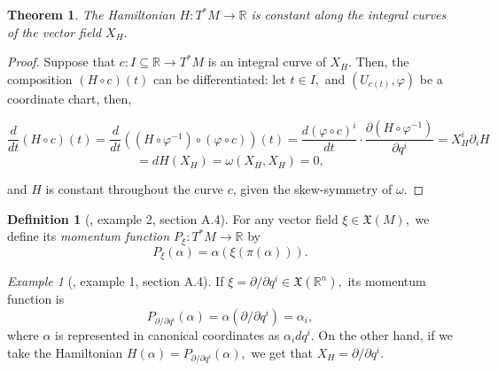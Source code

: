 \documentclass[12pt, letterpaper, reqno]{amsart}
\theoremstyle{definition}
\newtheorem{df}{Definition}
\theoremstyle{plain}
\newtheorem{thm}{Theorem}
\theoremstyle{remark}
\newtheorem{ex}{Example}
\providecommand{\DIFdelbegin}{} %
\providecommand{\DIFdelend}{} %
\newcommand{\DIFscaledelfig}{0.5}
\newlength{\DIFdelgraphicswidth} %
\newlength{\DIFdelgraphicsheight} %
\newcommand{\DIFdelincludegraphics}[2][]{%
\sbox{\DIFdelgraphicsbox}{\DIFOincludegraphics[#1]{#2}}%
\settoboxwidth{\DIFdelgraphicswidth}{\DIFdelgraphicsbox} %
\settoboxtotalheight{\DIFdelgraphicsheight}{\DIFdelgraphicsbox} %
\scalebox{\DIFscaledelfig}{%
\parbox[b]{\DIFdelgraphicswidth}{\usebox{\DIFdelgraphicsbox}\\[-\baselineskip] \rule{\DIFdelgraphicswidth}{0em}}\llap{\resizebox{\DIFdelgraphicswidth}{\DIFdelgraphicsheight}{%
\setlength{\unitlength}{\DIFdelgraphicswidth}%
\begin{picture}(1,1)%
\thicklines\linethickness{2pt} %
{\color[rgb]{1,0,0}\put(0,0){\framebox(1,1){}}}%
{\color[rgb]{1,0,0}\put(0,0){\line( 1,1){1}}}%
{\color[rgb]{1,0,0}\put(0,1){\line(1,-1){1}}}%
\end{picture}%
}\hspace*{3pt}}} %
} %
\DeclareRobustCommand{\DIFdelbegin}{\DIFOdelbegin \let\includegraphics\DIFdelincludegraphics} %
\DeclareRobustCommand{\DIFdelend}{\DIFOaddend \let\includegraphics\DIFOincludegraphics} %
\begin{document}
\begin{thm}\label{thm:constantCurves}
The Hamiltonian $ H: T^*M \rightarrow \mathbb{R} $ is constant along the integral curves of the vector field $ X_H. $ 	
\end{thm}

\begin{proof}
	Suppose that $ c:I\subseteq \mathbb{R} \rightarrow T^*M $ is an integral curve of $ X_H. $ Then, the composition $ (H\circ c) (t) $ can be differentiated: let $ t\in I, $ and $ (U_{c(t)}, \varphi) $ be a coordinate chart, then, 
		\DIFdelbegin %

\DIFdelend $$ \frac{d}{dt} (H\circ c)(t) = \frac{d}{dt} \left( \left( H\circ \varphi^{-1} \right)\circ \left( \varphi\circ c \right) \right)(t) = \frac{d(\varphi\circ c)^i}{dt}\cdot \frac{\partial (H\circ \varphi^{-1})}{\partial q^i}= X_H^i \partial_i H $$ $$= dH(X_H)=\omega(X_H, X_H)=0,$$    
\DIFdelbegin %

\DIFdelend and $ H $ is constant throughout the curve $ c $, given the skew-symmetry of $ \omega $. 
\end{proof}

\begin{df}[\cite{montgomery2002tour}, example 2, section A.4]
	For any vector field $ \xi\in \mathfrak{X}(M), $ we define its \textit{ momentum function $ P_\xi:T^*M \rightarrow \mathbb{R} $} by
	$$ P_\xi(\alpha)= \alpha(\xi(\pi(\alpha))). $$ 
\end{df}

\begin{ex}[\cite{montgomery2002tour}, example 1, section A.4]
	If $ \xi=\partial/\partial q^i\in \mathfrak{X}( \mathbb{R}^n), $ its momentum function is
	$$ P_{\partial/\partial q^i}(\alpha)=\alpha(\partial/\partial q^i) = \alpha_i, $$ 
	where $ \alpha$ is represented in canonical coordinates as $ \alpha_i dq^i $. On the other hand, if we take the Hamiltonian $ H(\alpha)=P_{\partial/\partial q^i}(\alpha), $ we get that $ X_H=\partial /\partial q^i. $ 
\end{ex}
\end{document}
